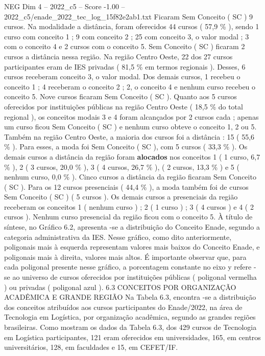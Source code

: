 \begin{textsample}{NEG Dim 4 – 2022\_c5 – Score -1.00 – 2022\_c5/enade\_2022\_tec\_log\_15f82e2ab1.txt}
Ficaram Sem Conceito ( SC ) 9 cursos.
Na modalidade a distância, foram oferecidos 44 cursos ( 57,9 \% ), sendo 1 curso com conceito 1 ; 9 com conceito 2 ; 25 com conceito 3, o valor modal ; 3 com o conceito 4 e 2 cursos com o conceito 5.
Sem Conceito ( SC ) ficaram 2 cursos a distância nessa região.
Na região Centro Oeste, 22 dos 27 cursos participantes eram de IES privadas ( 81,5 \% em termos regionais ).
Desses, 6 cursos receberam conceito 3, o valor modal.
Dos demais cursos, 1 recebeu o conceito 1 ; 4 receberam o conceito 2 ; 2, o conceito 4 e nenhum curso recebeu o conceito 5.
Nove cursos ficaram Sem Conceito ( SC ).
Quanto aos 5 cursos oferecidos por instituições públicas na região Centro Oeste ( 18,5 \% do total regional ), os conceitos modais 3 e 4 foram alcançados por 2 cursos cada ; apenas um curso ficou Sem Conceito ( SC ) e nenhum curso obteve o conceito 1, 2 ou 5.
Também na região Centro Oeste, a maioria dos cursos foi a distância : 15 ( 55,6 \% ).
Para esses, a moda foi Sem Conceito ( SC ), com 5 cursos ( 33,3 \% ).
Os demais cursos a distância da região foram \textbf{alocados} nos conceitos 1 ( 1 curso, 6,7 \% ), 2 ( 3 cursos, 20,0 \% ), 3 ( 4 cursos, 26,7 \% ), ( 2 cursos, 13,3 \% ) e 5 ( nenhum curso, 0,0 \% ).
Cinco cursos a distância da região ficaram Sem Conceito ( SC ).
Para os 12 cursos presenciais ( 44,4 \% ), a moda também foi de cursos Sem Conceito ( SC ) ( 5 cursos ).
Os demais cursos a presenciais da região receberam os conceitos 1 ( nenhum curso ) ; 2 ( 1 curso ) ; 3 ( 4 cursos ) e 4 ( 2 cursos ).
Nenhum curso presencial da região ficou com o conceito 5.
À título de síntese, no Gráfico 6.2, apresenta -se a distribuição do Conceito Enade, segundo a categoria administrativa da IES.
Nesse gráfico, como dito anteriormente, poligonais mais à esquerda representam valores mais baixos do Conceito Enade, e poligonais mais à direita, valores mais altos.
É importante observar que, para cada poligonal presente nesse gráfico, a porcentagem constante no eixo y refere -se ao universo de cursos oferecidos por instituições públicas ( poligonal vermelha ) ou privadas ( poligonal azul ). 6.3 CONCEITOS POR ORGANIZAÇÃO ACADÊMICA E GRANDE REGIÃO Na Tabela 6.3, encontra -se a distribuição dos conceitos atribuídos aos cursos participantes do Enade/2022, na área de Tecnologia em Logística, por organização acadêmica, segundo as grandes regiões brasileiras.
Como mostram os dados da Tabela 6.3, dos 429 cursos de Tecnologia em Logística participantes, 121 eram oferecidos em universidades, 165, em centros universitários, 128, em faculdades e 15, em CEFET/IF.

\end{textsample}
